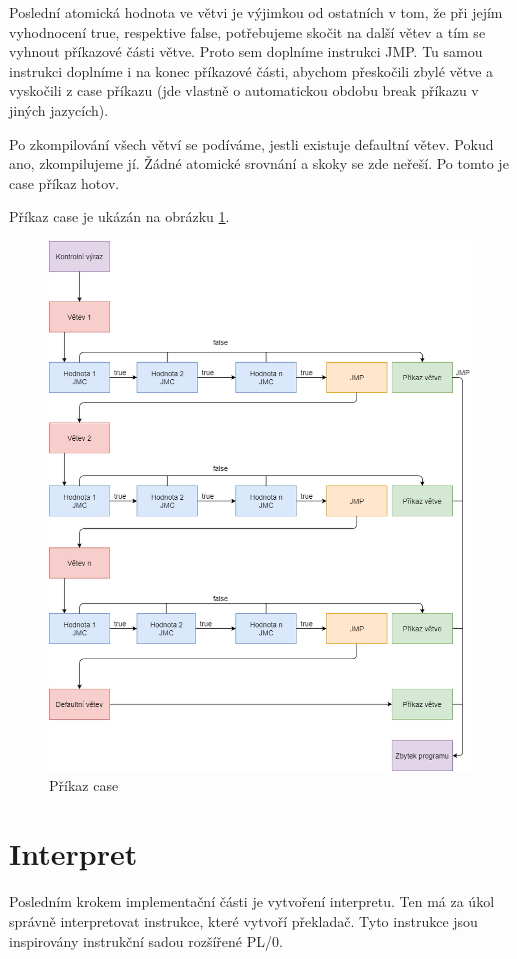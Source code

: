 \documentclass[
12pt,
a4paper,
pdftex,
czech,
titlepage
]{report}
\begin{document}
Poslední atomická hodnota ve větvi je výjimkou od ostatních v tom, že při jejím vyhodnocení true, respektive false, potřebujeme skočit na další větev a tím se vyhnout příkazové části větve. Proto sem doplníme instrukci JMP. Tu samou instrukci doplníme i na konec příkazové části, abychom přeskočili zbylé větve a vyskočili z case příkazu (jde vlastně o automatickou obdobu break příkazu v jiných jazycích).

Po zkompilování všech větví se podíváme, jestli existuje defaultní větev. Pokud ano, zkompilujeme jí. Žádné atomické srovnání a skoky se zde neřeší. Po tomto je case příkaz hotov.

Příkaz case je ukázán na obrázku \ref{case}.

\begin{figure}[H]
\caption{Příkaz case}
\label{case}
\includegraphics[width=\textwidth]{case.png}
\end{figure}

 
\section{Interpret}
Posledním krokem implementační části je vytvoření interpretu. Ten má za úkol správně interpretovat instrukce, které vytvoří překladač. Tyto instrukce jsou inspirovány instrukční sadou rozšířené PL/0. 
\end{document}
